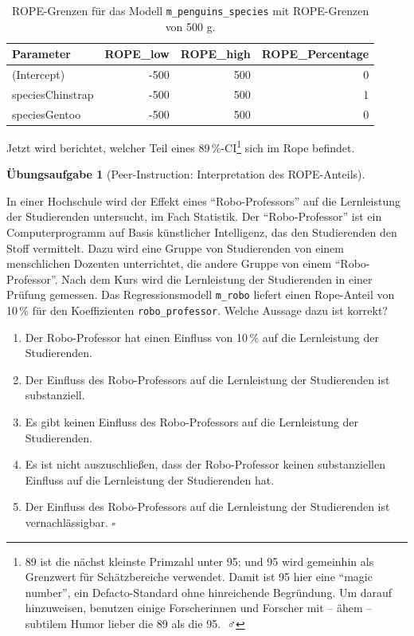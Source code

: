 \documentclass[
  ngerman,
  letterpaper,
  twoside,
  open=any]{scrbook}
\providecommand{\tightlist}{%
  \setlength{\itemsep}{0pt}\setlength{\parskip}{0pt}}\usepackage{longtable,booktabs,array}
\theoremstyle{definition}
\theoremstyle{plain}
\theoremstyle{definition}
\newtheorem{exercise}{Übungsaufgabe}[chapter]
\theoremstyle{definition}
\theoremstyle{definition}
\theoremstyle{definition}
\newtheorem{exercise}{Übungsaufgabe}[chapter]
\theoremstyle{remark}
\begin{document}
{

\begin{longtable}[]{@{}lrrr@{}}

\caption{\label{tbl-rope-species-rope-fine}ROPE-Grenzen für das Modell
\texttt{m\_penguins\_species} mit ROPE-Grenzen von 500 g.}

\tabularnewline

\toprule\noalign{}
Parameter & ROPE\_low & ROPE\_high & ROPE\_Percentage \\
\midrule\noalign{}
\endhead
\bottomrule\noalign{}
\endlastfoot
(Intercept) & -500 & 500 & 0 \\
speciesChinstrap & -500 & 500 & 1 \\
speciesGentoo & -500 & 500 & 0 \\

\end{longtable}

}

Jetzt wird berichtet, welcher Teil eines 89\,\%-CI\footnote{89 ist die
  nächst kleinste Primzahl unter 95; und 95 wird gemeinhin als Grenzwert
  für Schätzbereiche verwendet. Damit ist 95 hier eine \enquote{magic
  number}, ein Defacto-Standard ohne hinreichende Begründung. Um darauf
  hinzuweisen, benutzen einige Forscherinnen und Forscher mit -- ähem --
  subtilem Humor lieber die 89 als die 95. 🤷♂️} sich im Rope befindet.

\begin{exercise}[Peer-Instruction: Interpretation des
ROPE-Anteils]\protect\hypertarget{exr-peer-rope}{}\label{exr-peer-rope}

In einer Hochschule wird der Effekt eines \enquote{Robo-Professors} auf
die Lernleistung der Studierenden untersucht, im Fach Statistik. Der
\enquote{Robo-Professor} ist ein Computerprogramm auf Basis künstlicher
Intelligenz, das den Studierenden den Stoff vermittelt. Dazu wird eine
Gruppe von Studierenden von einem menschlichen Dozenten unterrichtet,
die andere Gruppe von einem \enquote{Robo-Professor}. Nach dem Kurs wird
die Lernleistung der Studierenden in einer Prüfung gemessen. Das
Regressionsmodell \texttt{m\_robo} liefert einen Rope-Anteil von 10\,\%
für den Koeffizienten \texttt{robo\_professor}. Welche Aussage dazu ist
korrekt?

\begin{enumerate}
\def\labelenumi{\Alph{enumi})}
\tightlist
\item
  Der Robo-Professor hat einen Einfluss von 10\,\% auf die Lernleistung
  der Studierenden.
\item
  Der Einfluss des Robo-Professors auf die Lernleistung der Studierenden
  ist substanziell.
\item
  Es gibt keinen Einfluss des Robo-Professors auf die Lernleistung der
  Studierenden.
\item
  Es ist nicht auszuschließen, dass der Robo-Professor keinen
  substanziellen Einfluss auf die Lernleistung der Studierenden hat.
\item
  Der Einfluss des Robo-Professors auf die Lernleistung der Studierenden
  ist vernachlässigbar. \(\square\)
\end{enumerate}

\end{exercise}
\end{document}
